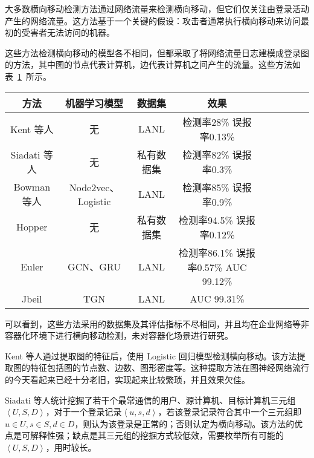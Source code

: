 {大多数横向移动检测方法通过网络流量来检测横向移动，但它们仅关注由登录活动产生的网络流量。这方法基于一个关键的假设：攻击者通常执行横向移动来访问最初的受害者无法访问的机器。

这些方法检测横向移动的模型各不相同，但都采取了将网络流量日志建模成登录图的方法，其中图的节点代表计算机，边代表计算机之间产生的流量。这些方法如表~\ref{tab:recent}~所示。

\begin{table}[t]
    \label{tab:recent}
    \centering
    \footnotesize%
    \setlength{\tabcolsep}{4pt}%
    \renewcommand{\arraystretch}{1.2}%
    \begin{tabular}{ccccccccc}
        \hline
        方法 & 机器学习模型 & 数据集 & 效果\\
        \hline
        Kent 等人\citep{kent2015authentication} & 无 & LANL\citep{kent-2015-cyberdata1} & 检测率28\% 误报率0.13\%\\
        Siadati 等人\citep{siadati2017detecting} & 无 & 私有数据集 & 检测率82\% 误报率0.3\%\\
        Bowman 等人\citep{bowman2020detecting} & Node2vec\citep{grover2016node2vec}、Logistic & LANL\citep{kent-2015-cyberdata1} & 检测率85\% 误报率0.9\%\\
        Hopper\citep{ho2021hopper} & 无 & 私有数据集 & 检测率94.5\% 误报率0.12\%\\
        Euler\citep{king2023euler} & GCN\citep{kipf2016semi}、GRU\citep{cho2014learning} & LANL\citep{kent-2015-cyberdata1} & 检测率86.1\% 误报率0.57\% AUC 99.12\%\\
        Jbeil\citep{khoury2023jbeil} & TGN\citep{rossi2020temporal} & LANL\citep{kent-2015-cyberdata1} & AUC 99.31\%\\
        \hline
    \end{tabular}
\end{table}

可以看到，这些方法采用的数据集及其评估指标不尽相同，并且均在企业网络等非容器化环境下进行横向移动检测，未对容器化场景进行研究。

Kent 等人\citep{kent2015authentication}通过提取图的特征后，使用 Logistic 回归模型检测横向移动。该方法提取图的特征包括图的节点数、边数、图形密度等。这种提取方法在图神经网络流行的今天看起来已经十分老旧，实现起来比较繁琐，并且效果欠佳。

Siadati 等人\citep{siadati2017detecting}统计挖掘了若干个最常通信的用户、源计算机、目标计算机三元组$\left<U,S,D\right>$，对于一个登录记录$\left<u,s,d\right>$，若该登录记录符合其中一个三元组即$u \in U, s \in S, d \in D$，则认为该登录是正常的；否则认定为横向移动。该方法的优点是可解释性强；缺点是其三元组的挖掘方式较低效，需要枚举所有可能的 $\left<U,S,D\right>$，用时较长。

}
